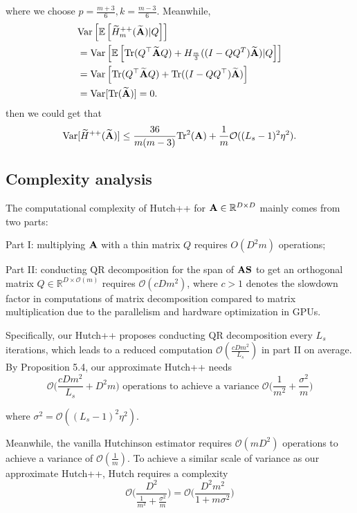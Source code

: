 where we choose $p=\frac{m+3}{6}, k=\frac{m-3}{6}$. Meanwhile, 
\begin{align*}
	&\mathrm{Var}\left[ \mathbb{E}\left[ \widetilde{H}_m^{++}(\widetilde{{\bf A}})|Q \right] \right]\\
	&=\mathrm{Var}\left[ \mathbb{E}\left[ \mathrm{Tr}(Q^\top \widetilde{{\bf A}} Q)+H_{\frac{m}{3}}( (I-QQ^T)\widetilde{{\bf A}})|Q \right] \right]\\
	&=\mathrm{Var}\left[ \mathrm{Tr}(Q^\top \widetilde{{\bf A}} Q)+\mathrm{Tr}( (I-QQ^\top)\widetilde{{\bf A}}) \right]\\
	&=\mathrm{Var}[\mathrm{Tr}(\widetilde{{\bf A}})]=0.
\end{align*}
then we could get that 
$$\mathrm{Var}[\widetilde{H}^{++}(\widetilde{{\bf A}})]\le \frac{36}{m(m-3)}\mathrm{Tr}^2({\bf A})+\frac{1}{m}\mathcal{O}((L_s-1)^2\eta^2).$$

\subsection{Complexity analysis}
The computational complexity of Hutch++ for ${\bf A}\in \mathbb{R}^{D\times D}$ mainly comes from two parts:

Part I: multiplying ${\bf A}$ with a thin matrix $Q$ requires $O(D^2m)$ operations;

Part II: conducting QR decomposition for the span of ${\bf A} {\bf S}$  to get an orthogonal matrix $Q\in \mathbb{R}^{D\times \mathcal{O}(m)}$ requires $\mathcal{O}(c D m^2)$, where $c > 1$ denotes the slowdown factor in computations of matrix decomposition compared to matrix multiplication due to the parallelism and hardware optimization in GPUs.

Specifically, our Hutch++ proposes conducting QR decomposition every $L_s$ iterations, which leads to a reduced computation $
\mathcal{O}\left(\frac{c D m^2}{L_s}\right)$ in part II on average. By Proposition 5.4, our approximate
Hutch++ needs
\begin{equation} \mathcal{O}\bigg(\frac{c D m^2}{L_s} + D^2 m\bigg) \text{ operations to achieve a variance } \mathcal{O}\bigg(\frac{1}{m^2} + \frac{\sigma^2}{m}\bigg) \end{equation}

where $\sigma^2=\mathcal{O}((L_s-1)^2 \eta^2)$.

Meanwhile,  the vanilla Hutchinson estimator requires $\mathcal{O}(m D^2)$ operations to achieve a variance of $\mathcal{O}\left(\frac{1}{m}\right)$. To achieve a similar scale of variance as our approximate Hutch++, Hutch requires a complexity $$\mathcal{O}\bigg(\frac{D^2}{\frac{1}{m^2} + \frac{\sigma^2}{m}}\bigg)=\mathcal{O}\bigg(\frac{D^2 m^2}{1 + m\sigma^2}\bigg)$$

